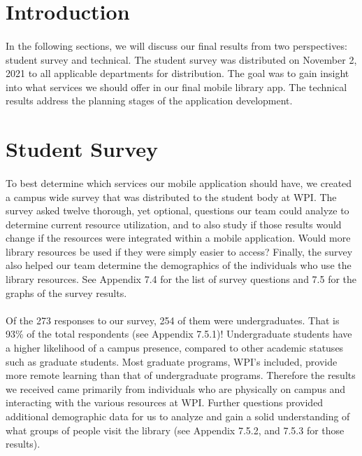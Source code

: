 \section{Introduction}

\paragraph{}
In the following sections, we will discuss our final results from two perspectives: student survey and technical. The student survey was distributed on November 2, 2021 to all applicable departments for distribution. The goal was to gain insight into what services we should offer in our final mobile library app. The technical results address the planning stages of the application development.

\section{Student Survey}
\paragraph{}
To best determine which services our mobile application should have, we created a campus wide survey that was distributed to the student body at WPI. The survey asked twelve thorough, yet optional, questions our team could analyze to determine current resource utilization, and to also study if those results would change if the resources were integrated within a mobile application. Would more library resources be used if they were simply easier to access? Finally, the survey also helped our team determine the demographics of the individuals who use the library resources. See Appendix 7.4 for the list of survey questions and 7.5 for the graphs of the survey results.

\paragraph{}
Of the 273 responses to our survey, 254 of them were undergraduates. That is 93\% of the total respondents (see Appendix 7.5.1)! Undergraduate students have a higher likelihood of a campus presence, compared to other academic statuses such as graduate students. Most graduate programs, WPI's included, provide more remote learning than that of undergraduate programs. Therefore the results we received came primarily from individuals who are physically on campus and interacting with the various resources at WPI. Further questions provided additional demographic data for us to analyze and gain a solid understanding of what groups of people visit the library (see Appendix 7.5.2, and 7.5.3 for those results). 


